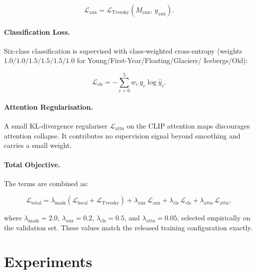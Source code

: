 \documentclass[remotesensing,article,accept,moreauthors,pdftex]{Definitions/mdpi}
\begin{document}
\begin{equation}
  \mathcal{L}_{\text{aux}} = \mathcal{L}_{\text{Tversky}}(\hat{M}_{\text{aux}},\, y_{\text{aux}}).
  \label{eq:aux_loss}
\end{equation}

\paragraph{Classification Loss.}
Six-class classification is supervised with class-weighted cross-entropy
(weights $1.0/1.0/1.5/1.5/1.5/1.0$ for Young/First-Year/Floating/Glaciers/
Icebergs/Old):

\begin{equation}
  \mathcal{L}_{\text{cls}} = -\sum_{c=0}^{5} w_c\, y_c \log \hat{y}_c.
  \label{eq:cls_loss}
\end{equation}

\paragraph{Attention Regularisation.}
A small KL-divergence regulariser $\mathcal{L}_{\text{attn}}$ on the CLIP
attention maps discourages attention collapse. It contributes no supervision
signal beyond smoothing and carries a small weight.

\paragraph{Total Objective.}
The terms are combined as:

\begin{equation}
  \mathcal{L}_{\text{total}} =
  \lambda_{\text{mask}} \!\left(\mathcal{L}_{\text{focal}} + \mathcal{L}_{\text{Tversky}}\right)
  + \lambda_{\text{aux}} \,\mathcal{L}_{\text{aux}}
  + \lambda_{\text{cls}} \,\mathcal{L}_{\text{cls}}
  + \lambda_{\text{attn}} \,\mathcal{L}_{\text{attn}},
  \label{eq:total_loss}
\end{equation}

\noindent where $\lambda_{\text{mask}} = 2.0$, $\lambda_{\text{aux}} = 0.2$,
$\lambda_{\text{cls}} = 0.5$, and $\lambda_{\text{attn}} = 0.05$, selected
empirically on the validation set. These values match the released training
configuration exactly.

\section{Experiments}
\label{sec:experiments}
\end{document}
